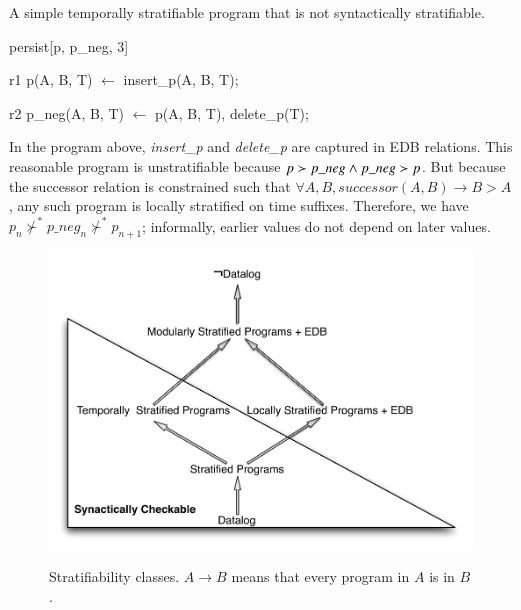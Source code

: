\begin{example}
A simple temporally stratifiable \slang program that is not syntactically stratifiable.

\begin{Dedalus}
persist[p, p\_neg, 3]  
  
r1
p(A, B, T) \(\leftarrow\)
  insert\_p(A, B, T);

r2  
p_neg(A, B, T) \(\leftarrow\)
  p(A, B, T),
  delete\_p(T);
\end{Dedalus}

In the \slang program above, \emph{insert\_p} and \emph{delete\_p} are captured
in EDB relations.  This reasonable program is unstratifiable because $p \succ
p\nega \land p\nega \succ p$.  But because the successor relation is
constrained such that $\forall A,B, successor(A, B) \rightarrow B > A$, any
such program is locally stratified on time suffixes.  Therefore, we have
$p_{n} \not\succ^* p\_neg_{n} \not\succ^* p_{n+1}$; informally, earlier values
do not depend on later values.
\end{example}

\begin{figure}[t]
  \centering
  \includegraphics[width=0.75\linewidth]{figures/dedalus_classes.pdf}
  \label{fig:dedalus-classes}
  \caption{Stratifiability classes.  $A \to B$ means that every program in $A$ is in $B$.}
\vspace{-8pt}
\end{figure}



